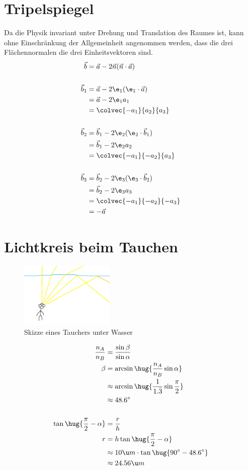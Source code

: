 \documentclass[ex,minted]{exercise}
\begin{document}
\section{Tripelspiegel}
Da die Physik invariant unter Drehung und Translation des Raumes ist,
kann ohne Einschränkung der Allgemeinheit angenommen werden, dass 
die drei Flächennormalen die drei Einheitsvektoren sind.
\begin{align*}
    \vec b &= \vec a - 2 \vec n (\vec n \cdot \vec a)\\
    \\
    \vec b_1 &= \vec a - 2 \e_1 (\e_1 \cdot \vec a)\\
    &= \vec a - 2 \e_1 a_1\\
    &= \colvec{-a_1}{a_2}{a_3}\\
    \\
    \vec b_2 &= \vec b_1 - 2 \e_2 (\e_2 \cdot \vec b_1)\\
    &= \vec b_1 - 2 \e_2 a_2\\
    &= \colvec{-a_1}{-a_2}{a_3}\\
    \\
    \vec b_3 &= \vec b_2 - 2 \e_3 (\e_3 \cdot \vec b_2)\\
    &= \vec b_2 - 2 \e_3 a_3\\
    &= \colvec{-a_1}{-a_2}{-a_3}\\
    &= - \vec a
\end{align*}

\newpage
\section{Lichtkreis beim Tauchen}

\begin{figure}[h]
    \centering
    \includegraphics[width=0.4\textwidth]{1.png}
    \caption{Skizze eines Tauchers unter Wasser}
\end{figure}
\begin{align*}
    \frac{n_A}{n_B} &= \frac{\sin \beta}{\sin \alpha}\\
    \beta  &= \arcsin\hug{\frac{n_A}{n_B} \sin\alpha}\\
    &\approx \arcsin\hug{\frac1{1.\bar 3} \sin\frac \pi 2}\\
    &\approx 48.6^\circ\\
    \\
    \tan\hug{\frac\pi2 - \alpha} &= \frac{r}{h}\\
    r &= h \tan\hug{\frac\pi2 - \alpha}\\
    &\approx 10\u m \cdot \tan \hug{90^\circ - 48.6^\circ}\\
    &\approx 24.56 \u m
\end{align*}
\end{document}
